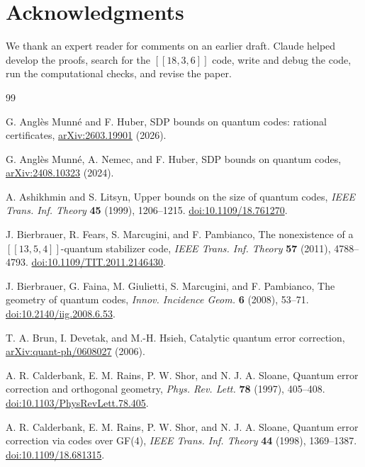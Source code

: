 \documentclass[11pt]{article}
\theoremstyle{definition}
\theoremstyle{remark}
\newcommand{\qc}[1]{[\![#1]\!]}
\begin{document}
\section*{Acknowledgments}
We thank an expert reader for comments on an earlier draft. Claude
helped develop the proofs, search for the \(\qc{18,3,6}\) code, write
and debug the code, run the computational checks, and revise the paper.

\begin{thebibliography}{99}

G. Angl\`es Munn\'e and F. Huber,
SDP bounds on quantum codes: rational certificates,
\href{https://arxiv.org/abs/2603.19901}{arXiv:2603.19901} (2026).

G. Angl\`es Munn\'e, A. Nemec, and F. Huber,
SDP bounds on quantum codes,
\href{https://arxiv.org/abs/2408.10323}{arXiv:2408.10323} (2024).

A. Ashikhmin and S. Litsyn,
Upper bounds on the size of quantum codes,
\emph{IEEE Trans. Inf. Theory} \textbf{45} (1999), 1206--1215.
\href{https://doi.org/10.1109/18.761270}{doi:10.1109/18.761270}.

J. Bierbrauer, R. Fears, S. Marcugini, and F. Pambianco,
The nonexistence of a \(\qc{13,5,4}\)-quantum stabilizer code,
\emph{IEEE Trans. Inf. Theory} \textbf{57} (2011), 4788--4793.
\href{https://doi.org/10.1109/TIT.2011.2146430}{doi:10.1109/TIT.2011.2146430}.

J. Bierbrauer, G. Faina, M. Giulietti, S. Marcugini, and F. Pambianco,
The geometry of quantum codes,
\emph{Innov. Incidence Geom.} \textbf{6} (2008), 53--71.
\href{https://doi.org/10.2140/iig.2008.6.53}{doi:10.2140/iig.2008.6.53}.

T. A. Brun, I. Devetak, and M.-H. Hsieh,
Catalytic quantum error correction,
\href{https://arxiv.org/abs/quant-ph/0608027}{arXiv:quant-ph/0608027} (2006).

A. R. Calderbank, E. M. Rains, P. W. Shor, and N. J. A. Sloane,
Quantum error correction and orthogonal geometry,
\emph{Phys. Rev. Lett.} \textbf{78} (1997), 405--408.
\href{https://doi.org/10.1103/PhysRevLett.78.405}{doi:10.1103/PhysRevLett.78.405}.

A. R. Calderbank, E. M. Rains, P. W. Shor, and N. J. A. Sloane,
Quantum error correction via codes over GF(4),
\emph{IEEE Trans. Inf. Theory} \textbf{44} (1998), 1369--1387.
\href{https://doi.org/10.1109/18.681315}{doi:10.1109/18.681315}.


\end{thebibliography}
\end{document}
